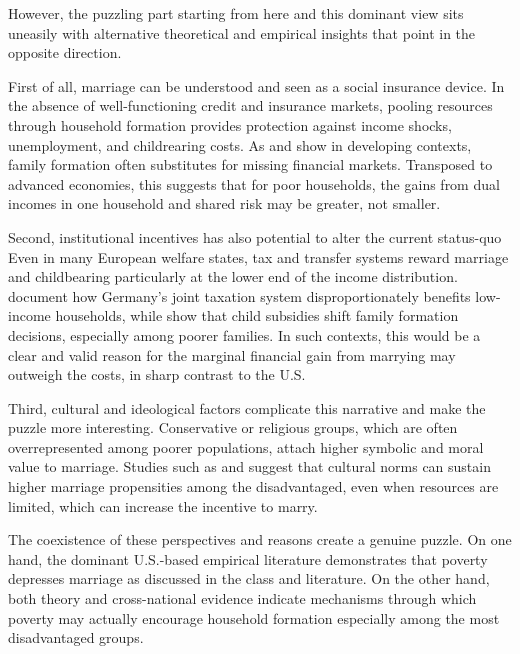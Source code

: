 However, the puzzling part starting from here and this dominant view sits uneasily with alternative theoretical and empirical insights that point in the opposite direction.

First of  all, marriage can be understood and seen as a social insurance device. In the absence of well-functioning credit and insurance markets, pooling resources through household formation provides protection against income shocks, unemployment, and childrearing costs. As \citet{RosenzweigStark1989} and \citet{Townsend1994} show in developing contexts, family formation often substitutes for missing financial markets. Transposed to advanced economies, this suggests that for poor households, the gains from dual incomes in one household and shared risk may be greater, not smaller.

Second, institutional incentives has also potential to alter the current status-quo Even in many European welfare states, tax and transfer systems reward marriage and childbearing particularly at the lower end of the income distribution. \citet{Steiner2011} document how Germany’s joint taxation system disproportionately benefits low-income households, while \citet{DoepkeKindermann2019} show that child subsidies shift family formation decisions, especially among poorer families. In such contexts, this would be a clear and valid reason for the marginal financial gain from marrying may outweigh the costs, in sharp contrast to the U.S.

Third, cultural and ideological factors complicate this narrative and make the puzzle more interesting. Conservative or religious groups, which are often overrepresented among poorer populations, attach higher symbolic and moral value to marriage. Studies such as \citet{Glaeser2007} and \citet{Lesthaeghe2010} suggest that cultural norms can sustain higher marriage propensities among the disadvantaged, even when resources are limited, which can increase the incentive to marry.

The coexistence of these perspectives and reasons create a genuine puzzle. On one hand, the dominant U.S.-based empirical literature demonstrates that poverty depresses marriage as discussed in the class and literature. On the other hand, both theory and cross-national evidence indicate mechanisms through which poverty may actually encourage household formation especially among the most disadvantaged groups.

